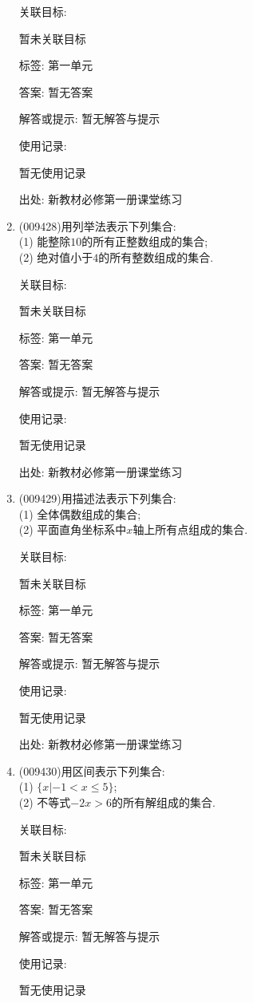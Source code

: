 \documentclass[10pt,a4paper]{article}
\begin{document}
\begin{enumerate}[1.]
关联目标:

暂未关联目标



标签: 第一单元

答案: 暂无答案

解答或提示: 暂无解答与提示

使用记录:

暂无使用记录


出处: 新教材必修第一册课堂练习
\item { (009428)}用列举法表示下列集合:\\
(1) 能整除$10$的所有正整数组成的集合;\\
(2) 绝对值小于$4$的所有整数组成的集合.


关联目标:

暂未关联目标



标签: 第一单元

答案: 暂无答案

解答或提示: 暂无解答与提示

使用记录:

暂无使用记录


出处: 新教材必修第一册课堂练习
\item { (009429)}用描述法表示下列集合:\\
(1) 全体偶数组成的集合;\\
(2) 平面直角坐标系中$x$轴上所有点组成的集合.


关联目标:

暂未关联目标



标签: 第一单元

答案: 暂无答案

解答或提示: 暂无解答与提示

使用记录:

暂无使用记录


出处: 新教材必修第一册课堂练习
\item { (009430)}用区间表示下列集合:\\
(1) $\{x|-1<x\le 5\}$;\\
(2) 不等式$-2x>6$的所有解组成的集合.


关联目标:

暂未关联目标



标签: 第一单元

答案: 暂无答案

解答或提示: 暂无解答与提示

使用记录:

暂无使用记录



\end{enumerate}
\end{document}
